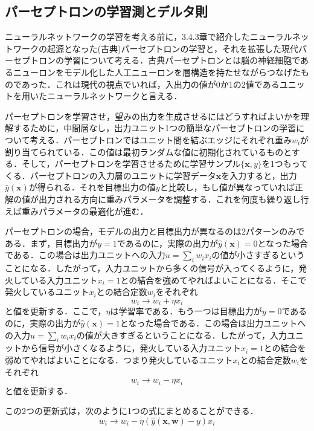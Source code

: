 \documentclass[a4paper,11pt]{jsreport}
\begin{document}
\subsection{パーセプトロンの学習測とデルタ則}
ニューラルネットワークの学習を考える前に，3.4.3章で紹介したニューラルネットワークの起源となった(古典)パーセプトロンの学習と，それを拡張した現代パーセプトロンの学習について考える．古典パーセプトロンとは脳の神経細胞であるニューロンをモデル化した人工ニューロンを層構造を持たせながらつなげたものであった．これは現代の視点でいれば，入出力の値が0か1の2値であるユニットを用いたニューラルネットワークと言える．\par
パーセプトロンを学習させ，望みの出力を生成させるにはどうすればよいかを理解するために，中間層なし，出力ユニット1つの簡単なパーセプトロンの学習について考える．パーセプトロンではユニット間を結ぶエッジにそれぞれ重み$w_i$が割り当てられている．この値は最初ランダムな値に初期化されているものとする．そして，パーセプトロンを学習させるために学習サンプル$\{\bm{x}, y\}$を1つもってくる．パーセプトロンの入力層のユニットに学習データ$\bm{x}$を入力すると，出力$\hat{y}(\bm{x})$が得られる．それを目標出力の値$y$と比較し，もし値が異なっていれば正解の値が出力される方向に重みパラメータを調整する．これを何度も繰り返し行えば重みパラメータの最適化が進む．\par
パーセプトロンの場合，モデルの出力と目標出力が異なるのは2パターンのみである．まず，目標出力が$y=1$であるのに，実際の出力が$\hat{y}(\bm{x})=0$となった場合である．この場合は出力ユニットへの入力$u=\sum_{i}w_i x_i$の値が小さすぎるということになる．したがって，入力ユニットから多くの信号が入ってくるように，発火している入力ユニット$x_i=1$との結合を強めてやればよいことになる．そこで発火しているユニット$x_i$との結合定数$w_i$をそれぞれ
\begin{equation}
  w_i \rightarrow w_i + \eta x_i
\end{equation} 
と値を更新する．ここで，$\eta$は学習率である．もう一つは目標出力が$y=0$であるのに，実際の出力が$\hat{y}(\bm{x})=1$となった場合である．この場合は出力ユニットへの入力$u=\sum_{i}w_i x_i$の値が大きすぎるということになる．したがって，入力ユニットから信号が小さくなるように，発火している入力ユニット$x_i=1$との結合を弱めてやればよいことになる．つまり発火しているユニット$x_i$との結合定数$w_i$をそれぞれ
\begin{equation}
  w_i \rightarrow w_i - \eta x_i
\end{equation} 
と値を更新する．\par
この2つの更新式は，次のように1つの式にまとめることができる．
\begin{equation}
  w_i \rightarrow w_i - \eta (\hat{y}(\bm{x},\bm{w}) - y) x_i
\end{equation}
\end{document}
